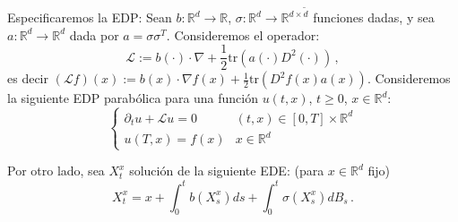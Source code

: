 \newp Especificaremos la EDP: Sean $b: \mathbb{R}^{d} \to \mathbb{R}$, $\sigma : \mathbb{R}^{d} \to  \mathbb{R}^{d \times \tilde{d}}$ funciones dadas, y sea $a: \mathbb{R}^{d} \to \mathbb{R}^{d}$ dada por $a = \sigma \sigma^T$. Consideremos el operador:
\begin{equation*}
    \mathcal{L} := b(\cdot) \cdot \nabla + \frac{1}{2} \text{tr}(a(\cdot) D^2 (\cdot )) \,,
\end{equation*}
es decir $(\mathcal{L} f)(x) := b(x) \cdot \nabla f(x) + \frac{1}{2} \text{tr}(D^2 f(x) a(x))$. 
\newp Consideremos la siguiente EDP parabólica para una función $u(t,x)$, $t \ge 0$, $x \in \mathbb{R}^{d}$: 
\begin{equation*}
    \label{eq:sde_11} 
    \tag{*} 
    \begin{cases}
        \partial_t u + \mathcal{L} u = 0 & (t,x) \in [0,T] \times \mathbb{R}^{d} \\ 
            u(T,x) = f(x) & x \in \mathbb{R}^{d}
    \end{cases}
\end{equation*}

Por otro lado, sea $X_t^{x}$ solución de la siguiente EDE: (para $x \in \mathbb{R}^d$ fijo)
\begin{equation*}
    \label{eq:sde_12}
    \tag{**}
    X_t^x = x + \int_{0}^{t} b(X_s^x) ds + \int_{0}^{t} \sigma (X_s^x) dB_s \,.
\end{equation*}

